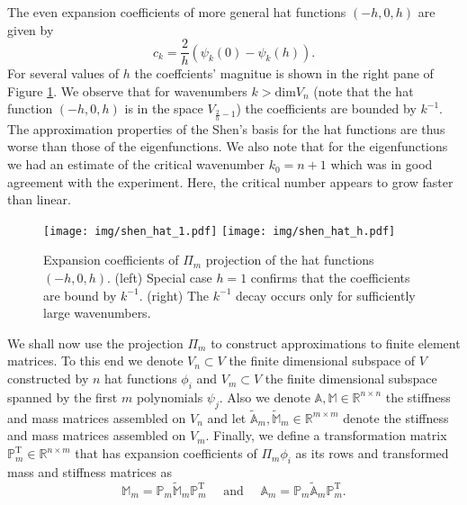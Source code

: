 \documentclass[a4paper,10pt]{article}
\newcommand{\R}{\ensuremath{\mathbb{R}}}
\newcommand{\Amat}{\ensuremath{\mathbb{A}}}
\newcommand{\Mmat}{\ensuremath{\mathbb{M}}}
\newcommand{\Ammatt}{\ensuremath{\tilde{\mathbb{A}}_m}}              %
\newcommand{\Mmmatt}{\ensuremath{\tilde{\mathbb{M}}_m}}              %
\newcommand{\Ammat}{\ensuremath{\mathbb{A}_m}}               %
\newcommand{\Mmmat}{\ensuremath{\mathbb{M}_m}}               %
\newcommand{\Pmat}{\ensuremath{\mathbb{P}_m}}                  %
\newcommand{\Pmatt}{\ensuremath{\mathbb{P}_m^{\text{T}}}}       %
\begin{document}
  The even expansion coefficients of more general hat functions $(-h, 0, h)$
  are given by
  \[
    c_{k} = \frac{2}{h}\left(\psi_k\left(0\right)- \psi_k\left(h\right)\right).
  \]
  For several values of $h$ the coeffcients' magnitue is shown in the right pane
  of Figure \ref{fig:shen_hat_projection}. We observe that for wavenumbers
  $k>\text{dim}V_n$ (note that the hat function $(-h, 0, h)$ is in the space
  $V_{\frac{2}{h}-1}$) the coefficients are bounded by $k^{-1}$. The
  approximation properties of the Shen's basis for the hat functions are thus
  worse than those of the eigenfunctions. We also note that for the
  eigenfunctions we had an estimate of the critical wavenumber $k_0=n+1$ which
  was in good agreement with the experiment. Here, the critical number appears
  to grow faster than linear.
  \begin{figure}
  \begin{center}
    \texttt{[image: img/shen\_hat\_1.pdf]}
    \texttt{[image: img/shen\_hat\_h.pdf]}
  \end{center}
  \label{fig:shen_hat_projection}
  \caption{Expansion coefficients of $\Pi_m$ projection of the hat functions
    $(-h, 0, h)$. (left) Special case $h=1$ confirms that the coefficients 
    are bound by $k^{-1}$. (right) The $k^{-1}$ decay occurs only for
    sufficiently large wavenumbers.}
  \end{figure}

  We shall now use the projection $\Pi_m$ to construct approximations to finite
  element matrices. To this end we denote $V_n\subset V$ the finite dimensional
  subspace of $V$ constructed by $n$ hat functions $\phi_i$ and $V_m\subset V$
  the finite dimensional subspace spanned by the first $m$ polynomials
  $\psi_j$. Also we denote $\Amat, \Mmat \in \R^{n \times n}$
  the stiffness and mass matrices assembled on $V_n$ and let
  $\Ammatt, \Mmmatt \in \R^{m\times m}$ denote the stiffness and mass matrices
  assembled on $V_m$. Finally, we define a transformation matrix
  $\Pmatt\in\R^{n \times m}$ that has expansion coefficients of $\Pi_m\phi_i$
  as its rows and transformed mass and stiffness matrices as
  \[
    \Mmmat = \Pmat\Mmmatt\Pmatt
    \quad{\text{ and }}\quad
    \Ammat = \Pmat\Ammatt\Pmatt.
  \]
  
\end{document}
